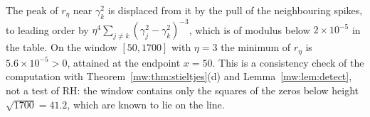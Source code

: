 The peak of $r_\eta$ near $\gamma_k^2$ is displaced from it by the pull of the neighbouring spikes, to leading order by $\eta^4\sum_{j\ne k}(\gamma_j^2-\gamma_k^2)^{-3}$, which is of modulus below $2\times10^{-5}$ in the table. On the window $[50,1700]$ with $\eta=3$ the minimum of $r_\eta$ is $5.6\times10^{-5}>0$, attained at the endpoint $x=50$. This is a consistency check of the computation with Theorem~\ref{mw:thm:stieltjes}(d) and Lemma~\ref{mw:lem:detect}, not a test of RH: the window contains only the squares of the zeros below height $\sqrt{1700}=41.2$, which are known to lie on the line.
